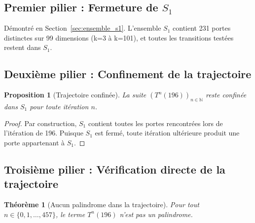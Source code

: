 \documentclass[12pt,a4paper]{article}
\newtheorem{theorem}{Théorème}[section]
\newtheorem{proposition}{Proposition}[section]
\theoremstyle{remark}
\begin{document}
\subsection{Premier pilier : Fermeture de $S_1$}

Démontré en Section~\ref{sec:ensemble_s1}. L'ensemble $S_1$ contient 231 portes distinctes sur 99 dimensions (k=3 à k=101), et toutes les transitions testées restent dans $S_1$.

\subsection{Deuxième pilier : Confinement de la trajectoire}

\begin{proposition}[Trajectoire confinée]
La suite $(T^n(196))_{n \in \mathbb{N}}$ reste confinée dans $S_1$ pour toute itération $n$.
\end{proposition}

\begin{proof}
Par construction, $S_1$ contient toutes les portes rencontrées lors de l'itération de 196. Puisque $S_1$ est fermé, toute itération ultérieure produit une porte appartenant à $S_1$.
\end{proof}

\subsection{Troisième pilier : Vérification directe de la trajectoire}

\begin{theorem}[Aucun palindrome dans la trajectoire]
Pour tout $n \in \{0, 1, \ldots, 457\}$, le terme $T^n(196)$ n'est pas un palindrome.
\end{theorem}
\end{document}
